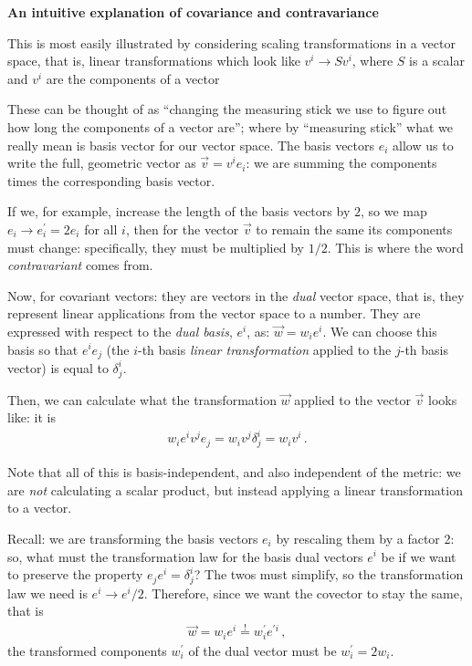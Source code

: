 \documentclass[main.tex]{subfiles}
\begin{document}
\begin{bluebox}
\textbf{An intuitive explanation of covariance and contravariance}

This is most easily illustrated by considering scaling transformations in a vector space, that is, linear transformations which look like \(v^{i} \rightarrow S v^{i}\), where \(S\) is a scalar and \(v^{i}\) are the components of a vector

These can be thought of as ``changing the measuring stick we use to figure out how long the components of a vector are''; where by ``measuring stick'' what we really mean is basis vector for our vector space.
The basis vectors \(e_{i}\) allow us to write the full, geometric vector as \(\vec{v} = v^{i} e_{i}\): we are summing the components times the corresponding basis vector.

If we, for example, increase the length of the basis vectors by \(2\), so we map \(e_{i} \rightarrow e_{i}^{\prime } = 2 e_{i}\) for all \(i\), then for the vector \(\vec{v}\) to remain the same its components must change: specifically, they must be multiplied by \(1/2\). 
This is where the word \emph{contravariant} comes from. 

Now, for covariant vectors: they are vectors in the \emph{dual} vector space, that is, they represent linear applications from the vector space to a number. They are expressed with respect to the \emph{dual basis}, \(e^{i}\), as: \(\vec{w} = w_{i} e^{i}\).
We can choose this basis so that \(e^{i} e_{j}\) (the \(i\)-th basis \emph{linear transformation} applied to the \(j\)-th basis vector) is equal to \(\delta^{i}_{j}\).

Then, we can calculate what the transformation \(\vec{w}\) applied to the vector \(\vec{v}\) looks like: it is 
%
\begin{align}
w_{i} e^{i} v^{j} e_{j} = w_{i} v^{j} \delta_{j}^{i} = w_{i} v^{i}
\,.
\end{align}

Note that all of this is basis-independent, and also independent of the metric: we are \emph{not} calculating a scalar product, but instead applying a linear transformation to a vector. 

Recall: we are transforming the basis vectors \(e_{i}\) by rescaling them by a factor 2: so, what must the transformation law for the basis dual vectors \(e^{i} \) be if we want to preserve the property \(e_{j} e^{i} = \delta^{i}_{j}\)?
The twos must simplify, so the transformation law we need is \(e^{i} \rightarrow e^{i} / 2\). 
Therefore, since we want the covector to stay the same, that is 
%
\begin{align}
\vec{w} = w_{i} e^{i} \overset{!}{=} w^{\prime }_{i} e^{\prime i}
\,,
\end{align}
%
the transformed components \(w_{i}^{\prime }\) of the dual vector must be \(w^{\prime }_{i} = 2 w_{i}\). 


\end{bluebox}
\end{document}
